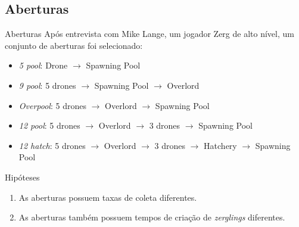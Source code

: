\documentclass{beamer}
\begin{document}
\subsection{Aberturas}
\begin{frame}{Aberturas}
Após entrevista com Mike Lange, um jogador Zerg de alto nível, um conjunto de aberturas foi selecionado:

\begin{itemize}
  \item \emph{5 pool}: Drone $\rightarrow$ Spawning Pool
  \item \emph{9 pool}: 5 drones $\rightarrow$ Spawning Pool $\rightarrow$ Overlord
  \item \emph{Overpool}: 5 drones $\rightarrow$ Overlord $\rightarrow$ Spawning Pool
  \item \emph{12 pool}: 5 drones $\rightarrow$ Overlord $\rightarrow$ 3 drones $\rightarrow$ Spawning Pool
  \item \emph{12 hatch}: 5 drones $\rightarrow$ Overlord $\rightarrow$ 3 drones $\rightarrow$ Hatchery $\rightarrow$ Spawning Pool
\end{itemize}
\end{frame}
\begin{frame}{Hipóteses}
\begin{enumerate}
  \item As aberturas possuem taxas de coleta diferentes.
  \item As aberturas também possuem tempos de criação de \emph{zerglings} diferentes.
\end{enumerate}
\end{frame}
\end{document}
